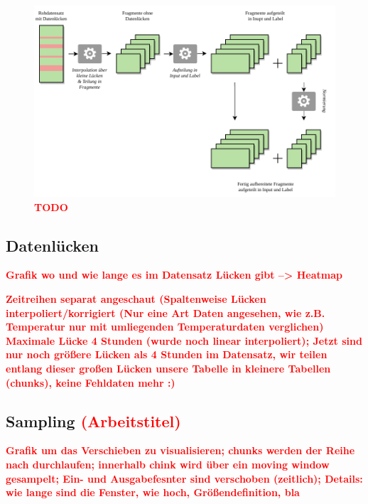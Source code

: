 \documentclass[
12pt, %
toc=listofnumbered, %
toc=chapterentrydotfill, %
numbers=noenddot, %
captions=tableheading, %
bibliography=numbered
]{scrreprt}
\let\Oldsubsection\subsection
\renewcommand{\subsection}{\FloatBarrier\Oldsubsection}
\newcommand{\highlight}[1]{\textbf{\textcolor{red}{#1}}}
\begin{document}
\begin{figure}[tph]
	\begin{center}
		\includegraphics[]{./images/preprocessing.pdf}
		\caption{\highlight{{TODO}}}
		\label{fig:preprocessing}
	\end{center}
\end{figure}

\subsection{Datenlücken}\label{section:Datenlücken}
\highlight{Grafik wo und wie lange es im Datensatz Lücken gibt --> Heatmap}

\highlight{Zeitreihen separat angeschaut (Spaltenweise Lücken interpoliert/korrigiert (Nur eine Art Daten angesehen, wie z.B. Temperatur nur mit umliegenden Temperaturdaten verglichen) 
Maximale Lücke 4 Stunden (wurde noch linear interpoliert); 
Jetzt sind nur noch größere Lücken als 4 Stunden im Datensatz, wir teilen entlang dieser großen Lücken unsere Tabelle in kleinere Tabellen (chunks), keine Fehldaten mehr :)}

\subsection{Sampling \highlight{(Arbeitstitel)}}
\highlight{Grafik um das Verschieben zu visualisieren; chunks werden der Reihe nach durchlaufen; 
innerhalb chink wird über ein moving window gesampelt; Ein- und Ausgabefesnter sind verschoben (zeitlich); 
Details: wie lange sind die Fenster, wie hoch, Größendefinition, bla}
\end{document}
